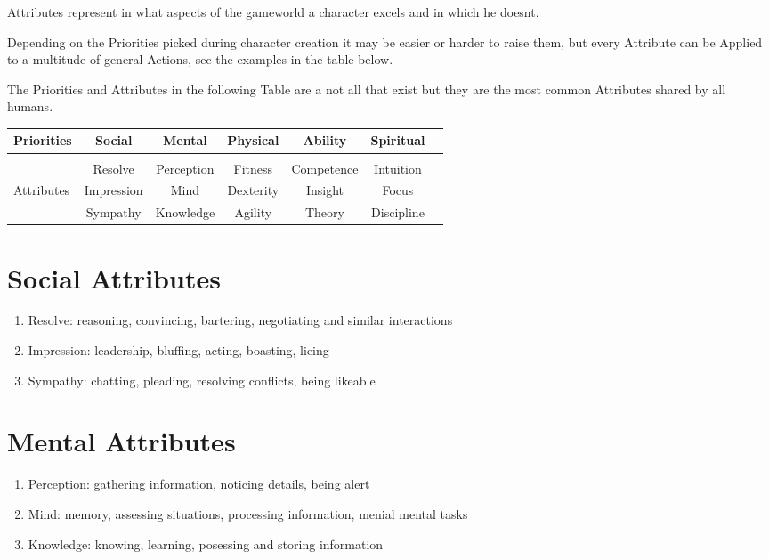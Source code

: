 Attributes represent in what aspects of the gameworld a character excels and in which he doesnt.\par
Depending on the Priorities picked during character creation it may be easier or harder to raise them, but every
Attribute can be Applied to a multitude of general Actions, see the examples in the table below.\par
The Priorities and Attributes in the following Table are a not all that exist
but they are the most common Attributes shared by all humans.\par
\begin{tabular}{l||cccccc}
    Priorities      &Social        &Mental         &Physical    &Ability     &Spiritual  \\\hline\\
                    &Resolve       &Perception     &Fitness     &Competence  &Intuition \\
    Attributes      &Impression    &Mind           &Dexterity   &Insight     &Focus\\
                    &Sympathy      &Knowledge      &Agility     &Theory      &Discipline\\



\end{tabular}\vspace{1cm}
\section{Social Attributes}\label{sec:charisma-attributes}
\begin{enumerate}[label= -]
    \item {Resolve}: reasoning, convincing, bartering, negotiating and similar interactions
    \item {Impression}: leadership, bluffing, acting, boasting, lieing
    \item {Sympathy}: chatting, pleading, resolving conflicts, being likeable
\end{enumerate}
\section{Mental Attributes}\label{sec:mental-attributes}
\begin{enumerate}[label=-]
    \item {Perception}: gathering information, noticing details, being alert
    \item {Mind}: memory, assessing situations, processing information, menial mental tasks
    \item {Knowledge}: knowing, learning, posessing and storing information
\end{enumerate}
